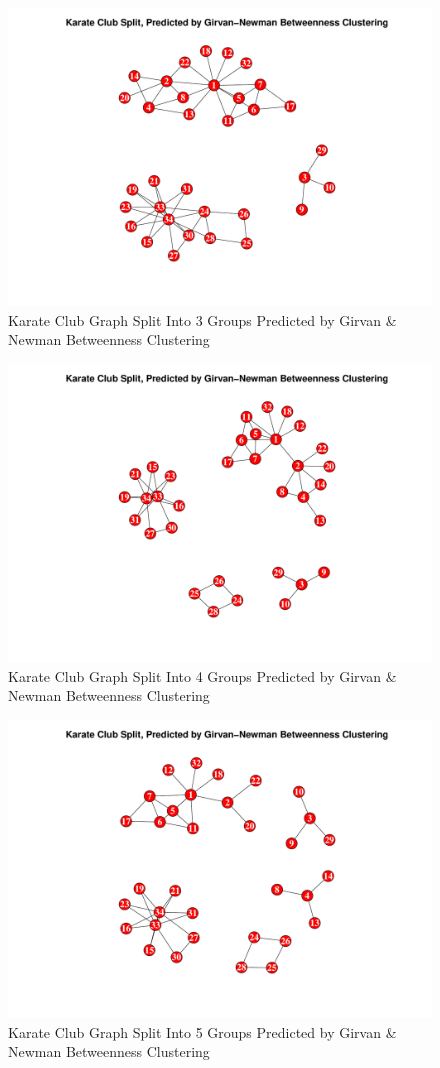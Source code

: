 \documentclass[letterpaper,11pt]{article}
\begin{document}
\begin{figure}[h]
\includegraphics[scale=0.5]{group-of-3.pdf}
\caption{Karate Club Graph Split Into 3 Groups Predicted by Girvan \& Newman Betweenness Clustering}
\label{fig:club-3-split}
\end{figure}

\begin{figure}[h]
\includegraphics[scale=0.5]{group-of-4.pdf}
\caption{Karate Club Graph Split Into 4 Groups Predicted by Girvan \& Newman Betweenness Clustering}
\label{fig:club-4-split}
\end{figure}

\begin{figure}[h]
\includegraphics[scale=0.5]{group-of-5.pdf}
\caption{Karate Club Graph Split Into 5 Groups Predicted by Girvan \& Newman Betweenness Clustering}
\label{fig:club-5-split}
\end{figure}


\clearpage


\end{document}
